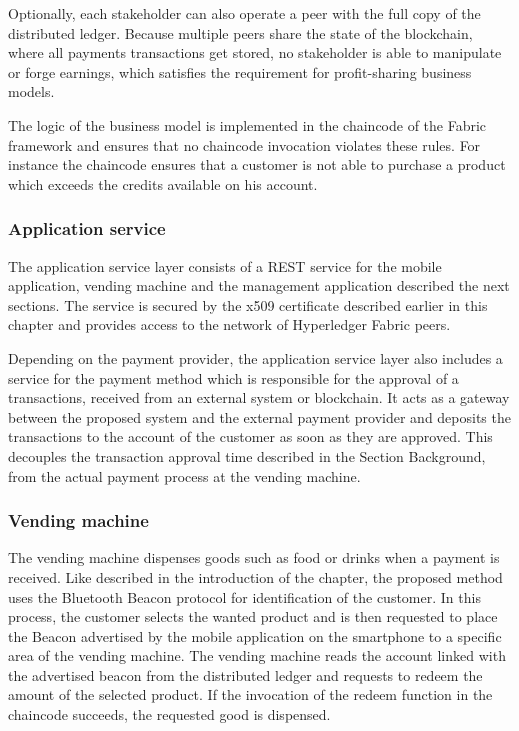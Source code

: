 Optionally, each stakeholder can also operate a peer with the full copy of the distributed ledger. Because multiple peers share the state of the blockchain, where all payments transactions get stored, no stakeholder is able to manipulate or forge earnings, which satisfies the requirement for profit-sharing business models. 

The logic of the business model is implemented in the chaincode of the Fabric framework and ensures that no chaincode invocation violates these rules. For instance the chaincode ensures that a customer is not able to purchase a product which exceeds the credits available on his account.

\subsubsection{Application service}
The application service layer consists of a REST service for the mobile application, vending machine and the management application described the next sections. The service is secured by the x509 certificate described earlier in this chapter and provides access to the network of Hyperledger Fabric peers. 

Depending on the payment provider, the application service layer also includes a service for the payment method which is responsible for the approval of a transactions, received from an external system or blockchain. It acts as a gateway between the proposed system and the external payment provider and deposits the transactions to the account of the customer as soon as they are approved. This decouples the transaction approval time described in the Section Background, from the actual payment process at the vending machine.

\subsubsection{Vending machine}
The vending machine dispenses goods such as food or drinks when a payment is received. Like described in the introduction of the chapter, the proposed method uses the Bluetooth Beacon protocol for identification of the customer. In this process, the customer selects the wanted product and is then requested to place the Beacon advertised by the mobile application on the smartphone to a specific area of the vending machine. The vending machine reads the account linked with the advertised beacon from the distributed ledger and requests to redeem the amount of the selected product. If the invocation of the redeem function in the chaincode succeeds, the requested good is dispensed.

